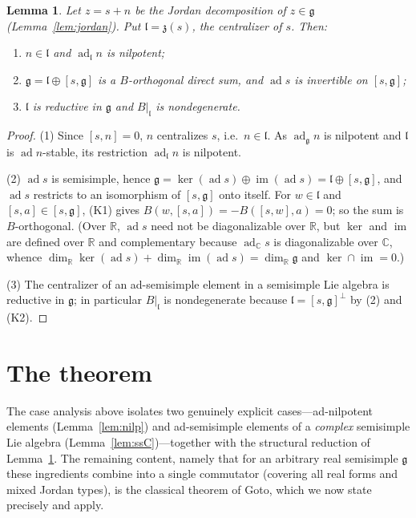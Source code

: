 \documentclass{amsart}
\newtheorem{lemma}{Lemma}
\theoremstyle{definition}
\begin{document}
\begin{lemma}\label{lem:centred}
Let $z=s+n$ be the Jordan decomposition of $z\in\mathfrak g$
(Lemma~\ref{lem:jordan}). Put $\mathfrak l=\mathfrak z(s)$, the centralizer of
$s$. Then:
\begin{enumerate}
\item $n\in\mathfrak l$ and $\operatorname{ad}_{\mathfrak l}n$ is nilpotent;
\item $\mathfrak g=\mathfrak l\oplus[s,\mathfrak g]$ is a $B$-orthogonal direct
sum, and $\operatorname{ad}s$ is invertible on $[s,\mathfrak g]$;
\item $\mathfrak l$ is reductive in $\mathfrak g$ and $B|_{\mathfrak l}$ is
nondegenerate.
\end{enumerate}
\end{lemma}

\begin{proof}
(1) Since $[s,n]=0$, $n$ centralizes $s$, i.e.\ $n\in\mathfrak l$. As
$\operatorname{ad}_{\mathfrak g}n$ is nilpotent and $\mathfrak l$ is
$\operatorname{ad}n$-stable, its restriction $\operatorname{ad}_{\mathfrak l}n$
is nilpotent.

(2) $\operatorname{ad}s$ is semisimple, hence
$\mathfrak g=\ker(\operatorname{ad}s)\oplus\operatorname{im}(\operatorname{ad}s)
=\mathfrak l\oplus[s,\mathfrak g]$, and $\operatorname{ad}s$ restricts to an
isomorphism of $[s,\mathfrak g]$ onto itself. For $w\in\mathfrak l$ and
$[s,a]\in[s,\mathfrak g]$, (K1) gives $B(w,[s,a])=-B([s,w],a)=0$; so the sum is
$B$-orthogonal. (Over $\mathbb R$, $\operatorname{ad}s$ need not be
diagonalizable over $\mathbb R$, but $\ker$ and $\operatorname{im}$ are defined
over $\mathbb R$ and complementary because $\operatorname{ad}_{\mathbb C}s$ is
diagonalizable over $\mathbb C$, whence
$\dim_{\mathbb R}\ker(\operatorname{ad}s)+\dim_{\mathbb R}\operatorname{im}(\operatorname{ad}s)
=\dim_{\mathbb R}\mathfrak g$ and $\ker\cap\operatorname{im}=0$.)

(3) The centralizer of an ad-semisimple element in a semisimple Lie algebra is
reductive in $\mathfrak g$; in particular $B|_{\mathfrak l}$ is nondegenerate
because $\mathfrak l=[s,\mathfrak g]^{\perp}$ by (2) and (K2).
\end{proof}

\section{The theorem}

The case analysis above isolates two genuinely explicit cases—ad-nilpotent
elements (Lemma~\ref{lem:nilp}) and ad-semisimple elements of a \emph{complex}
semisimple Lie algebra (Lemma~\ref{lem:ssC})—together with the structural
reduction of Lemma~\ref{lem:centred}. The remaining content, namely that for an
arbitrary real semisimple $\mathfrak g$ these ingredients combine into a single
commutator (covering all real forms and mixed Jordan types), is the classical
theorem of Goto, which we now state precisely and apply.
\end{document}
